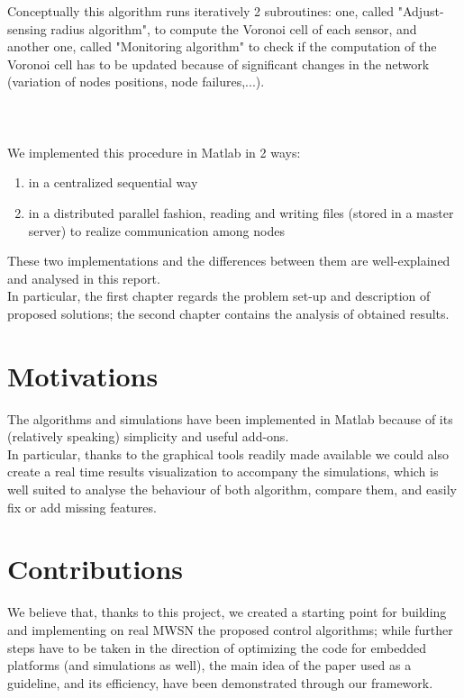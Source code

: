 \documentclass[a4paper,11pt,oneside]{book}
\begin{document}
	Conceptually this algorithm runs iteratively 2 subroutines: one, called "Adjust-sensing radius algorithm", to compute the Voronoi cell of each sensor, and another one, called "Monitoring algorithm" to check if the computation of the Voronoi cell has to be updated because of significant changes in the network (variation of nodes positions, node failures,...).\\\\\\\\	
	We implemented this procedure in Matlab in 2 ways:
	\begin{enumerate}
		\item in a centralized sequential way
		\item in a distributed parallel fashion, reading and writing files (stored in a master server) to realize communication among nodes
	\end{enumerate}
	These two implementations and the differences between them are well-explained and analysed in this report.\\
	In particular, the first chapter regards the problem set-up and description of proposed solutions; the second chapter contains the analysis of obtained results.\\
	
	
	\section*{Motivations}
	The algorithms and simulations have been implemented in Matlab because of its (relatively speaking) simplicity and useful add-ons.\\
	In particular, thanks to the graphical tools readily made available we could also create a real time results visualization to accompany the simulations, which is well suited to analyse the behaviour of both algorithm, compare them, and easily fix or add missing features.
	
	
	\section*{Contributions}
	We believe that, thanks to this project, we created a starting point for building and implementing on real MWSN the proposed control algorithms; while further steps have to be taken in the direction of optimizing the code for embedded platforms (and simulations as well), the main idea of the paper used as a guideline, and its efficiency, have been demonstrated through our framework.
	
\end{document}
